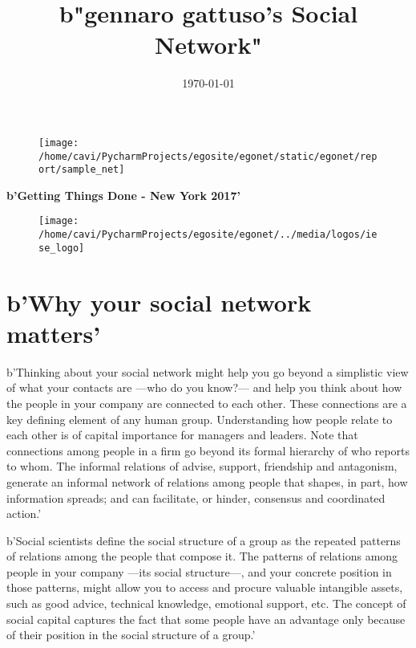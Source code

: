 \documentclass[a4paper,12pt]{article}
\title{\Huge{b"gennaro gattuso's Social Network"}}
\date{\today}
\begin{document}
\clearpage
\thispagestyle{empty}

\maketitle


\begin{figure}[H]
\centering
\texttt{[image: /home/cavi/PycharmProjects/egosite/egonet/static/egonet/report/sample\_net]}
\end{figure}


\begin{center}
\Large{\textbf{b'Getting Things Done - New York 2017'}}


\begin{figure}[H]
\centering
\texttt{[image: /home/cavi/PycharmProjects/egosite/egonet/../media/logos/iese\_logo]}
\end{figure}

\small{}
\end{center}

\newpage
\clearpage
{}


\section*{b'Why your social network matters'}


b'Thinking about your social network might help you go beyond a simplistic view of what your contacts are ---who do you know?--- and help you think about how the people in your company are connected to each other. These connections are a key defining element of any human group. Understanding how people relate to each other is of capital importance for managers and leaders. Note that connections among people in a firm go beyond its formal hierarchy of who reports to whom. The informal relations of advise, support, friendship and antagonism, generate an informal network of relations among people that shapes, in part, how information spreads; and can facilitate, or hinder, consensus and coordinated action.'

b'Social scientists define the social structure of a group as the repeated patterns of relations among the people that compose it. The patterns of relations among people in your company ---its social structure---, and your concrete position in those patterns, might allow you to access and procure valuable intangible assets, such as good advice, technical knowledge, emotional support, etc. The concept of social capital captures the fact that some people have an advantage only because of their position in the social structure of a group.'
\end{document}
